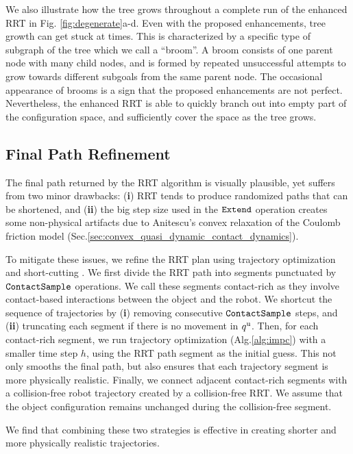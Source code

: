 We also illustrate how the tree grows throughout a complete run of the enhanced RRT in Fig. \ref{fig:degenerate}a-d. Even with the proposed enhancements, tree growth can get stuck at times. This is characterized by a specific type of subgraph of the tree which we call a ``broom''. A broom consists of one parent node with many child nodes, and is formed by repeated unsuccessful attempts to grow towards different subgoals from the same parent node. The occasional appearance of brooms is a sign that the proposed enhancements are not perfect. Nevertheless, the enhanced RRT is able to quickly branch out into empty part of the configuration space, and sufficiently cover the space as the tree grows. 

\subsection{Final Path Refinement}

The final path returned by the RRT algorithm is visually plausible, yet suffers from two minor drawbacks: (\textbf{i}) RRT tends to produce randomized paths that can be shortened, and (\textbf{ii}) the big step size used in the $\mathtt{Extend}$ operation creates some non-physical artifacts due to Anitescu’s convex relaxation of the Coulomb friction model (Sec.\ref{sec:convex_quasi_dynamic_contact_dynamics}). 

To mitigate these issues, we refine the RRT plan using trajectory optimization \cite{lgp,terry} and short-cutting \cite{shortcutting}. 
We first divide the RRT path into segments punctuated by $\mathtt{ContactSample}$ operations. We call these segments contact-rich as they involve contact-based interactions between the object and the robot. 
We shortcut the sequence of trajectories by (\textbf{i}) removing consecutive $\mathtt{ContactSample}$ steps, and (\textbf{ii}) truncating each segment if there is no movement in ${q^\mathrm{u}}$. 
Then, for each contact-rich segment, we run trajectory optimization (Alg.\ref{alg:impc}) with a smaller time step $h$, using the RRT path segment as the initial guess. This not only smooths the final path, but also ensures that each trajectory segment is more physically realistic.
Finally, we connect adjacent contact-rich segments with a collision-free robot trajectory created by a collision-free RRT. We assume that the object configuration remains unchanged during the collision-free segment.

We find that combining these two strategies is effective in creating shorter and more physically realistic trajectories. 

